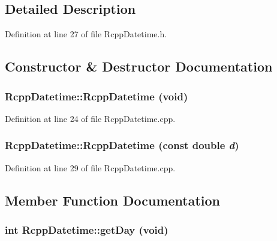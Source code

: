 \subsection{Detailed Description}


Definition at line 27 of file RcppDatetime.h.

\subsection{Constructor \& Destructor Documentation}
\hypertarget{classRcppDatetime_a5a1679444e775781bf038553ef3b04ae}{
\subsubsection[{RcppDatetime}]{\setlength{\rightskip}{0pt plus 5cm}RcppDatetime::RcppDatetime (void)}}
\label{classRcppDatetime_a5a1679444e775781bf038553ef3b04ae}


Definition at line 24 of file RcppDatetime.cpp.\hypertarget{classRcppDatetime_a43972d46cd15e6cb666d61f13bdc31f2}{
\subsubsection[{RcppDatetime}]{\setlength{\rightskip}{0pt plus 5cm}RcppDatetime::RcppDatetime (const double {\em d})}}
\label{classRcppDatetime_a43972d46cd15e6cb666d61f13bdc31f2}


Definition at line 29 of file RcppDatetime.cpp.

\subsection{Member Function Documentation}
\hypertarget{classRcppDatetime_a23e9f09bef162e1ffef0e43f8a446b77}{
\subsubsection[{getDay}]{\setlength{\rightskip}{0pt plus 5cm}int RcppDatetime::getDay (void)}}
\label{classRcppDatetime_a23e9f09bef162e1ffef0e43f8a446b77}


